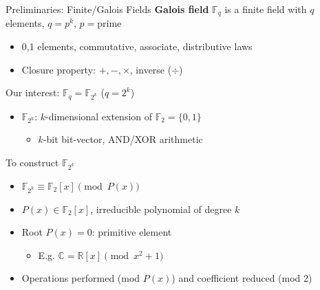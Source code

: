 \documentclass[xcolor=dvipsnames]{beamer}
\newcommand{\Fkk}{{\mathbb{F}}_{2^k}}
\newcommand{\bi}{\begin{itemize}}
\newcommand{\ei}{\end{itemize}}
\newcommand{\C}{{\mathbb{C}}}
\newcommand{\R}{{\mathbb{R}}}
\begin{document}
\begin{frame}{\large{Preliminaries: Finite/Galois Fields}}
\textbf {Galois field} $\mathbb{F}_q$ is a finite field with $q$
elements, $q = p^k$, $p = $prime
\begin{itemize}
\item 0,1 elements, commutative, associate, distributive laws
\item Closure property: $+,-,\times$, inverse ($\div$)
\end{itemize}


Our interest: $\mathbb{F}_{q} = \Fkk$ ($q = 2^k$)
\begin{itemize}
\item  $\mathbb{F}_{2^k}$: $k$-dimensional extension of  $\mathbb{F}_{2}=\{0,1\}$
	\begin{itemize}
	\item $k$-bit bit-vector, AND/XOR arithmetic
	\end{itemize}
\end{itemize}

To construct $\mathbb{F}_{2^k}$
\begin{itemize}
\item $\mathbb{F}_{2^k} \equiv \mathbb{F}_{2}[x] \pmod {P(x)}$
\item $P(x) \in \mathbb{F}_{2}[x]$, irreducible polynomial of degree $k$
\item Root $P(x)=0$: primitive element
\bi
\item E.g. $\C   = \R[x] \pmod{ x^2+1}$
\ei
\item Operations performed (mod $P(x)$) and coefficient reduced (mod 2)

\end{itemize}
\end{frame}
\end{document}
